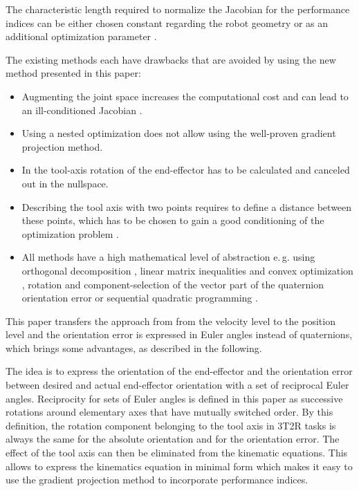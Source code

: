 \documentclass[twocolumn,10pt]{IFTOMM}
\begin{document}
The characteristic length required to normalize the Jacobian for the performance indices can be either chosen constant regarding the robot geometry \cite{ZhuQuCaoYan2013} or as an additional optimization parameter \cite{LegerAng2016}.

The existing methods each have drawbacks that are avoided by using the new method presented in this paper:
\begin{itemize}
    \item Augmenting the joint space \cite{Baron2000} increases the computational cost and can lead to an ill-conditioned Jacobian \cite{HuoBar2008}.
    \item Using a nested optimization \cite{ZhuQuCaoYan2013,GuoDonKe2015} does not allow using the well-proven gradient projection method.
    \item In \cite{Zlajpah2017} the tool-axis rotation of the end-effector has to be calculated and canceled out in the nullspace.
    \item Describing the tool axis with two points requires to define a distance between these points, which has to be chosen to gain a good conditioning of the optimization problem \cite{LegerAng2016}.
    \item All methods have a high mathematical level of abstraction e.\,g. using orthogonal decomposition \cite{HuoBar2008}, linear matrix inequalities and convex optimization \cite{FromGra2010}, rotation and component-selection of the vector part of the quaternion orientation error \cite{Zlajpah2017} or sequential quadratic programming \cite{LegerAng2016}.
\end{itemize}

This paper transfers the approach from \cite{Zlajpah2017} from the velocity level to the position level and the orientation error is expressed in Euler angles instead of quaternions, which brings some advantages, as described in the following.

The idea is to express the orientation of the end-effector and the orientation error between desired and actual end-effector orientation with a set of reciprocal Euler angles.
Reciprocity for sets of Euler angles is defined in this paper as successive rotations around elementary axes that have mutually switched order.
By this definition, the rotation component belonging to the tool axis in 3T2R tasks is always the same for the absolute orientation and for the orientation error.
The effect of the tool axis can then be eliminated from the kinematic equations.
This allows to express the kinematics equation in minimal form which makes it easy to use the gradient projection method to incorporate performance indices.
\end{document}
